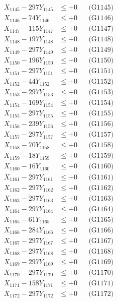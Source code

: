 \documentclass[a4paper,10pt]{article}
\begin{document}
{\begin{align}
X_{1145} - 297Y_{1145} &\leq +0 && \text{(G1145)} \\
X_{1146} - 74Y_{1146} &\leq +0 && \text{(G1146)} \\
X_{1147} - 115Y_{1147} &\leq +0 && \text{(G1147)} \\
X_{1148} - 197Y_{1148} &\leq +0 && \text{(G1148)} \\
X_{1149} - 297Y_{1149} &\leq +0 && \text{(G1149)} \\
X_{1150} - 196Y_{1150} &\leq +0 && \text{(G1150)} \\
\allowbreak
X_{1151} - 297Y_{1151} &\leq +0 && \text{(G1151)} \\
X_{1152} - 44Y_{1152} &\leq +0 && \text{(G1152)} \\
X_{1153} - 297Y_{1153} &\leq +0 && \text{(G1153)} \\
X_{1154} - 169Y_{1154} &\leq +0 && \text{(G1154)} \\
X_{1155} - 297Y_{1155} &\leq +0 && \text{(G1155)} \\
X_{1156} - 239Y_{1156} &\leq +0 && \text{(G1156)} \\
X_{1157} - 297Y_{1157} &\leq +0 && \text{(G1157)} \\
X_{1158} - 70Y_{1158} &\leq +0 && \text{(G1158)} \\
X_{1159} - 18Y_{1159} &\leq +0 && \text{(G1159)} \\
X_{1160} - 16Y_{1160} &\leq +0 && \text{(G1160)} \\
\allowbreak
X_{1161} - 297Y_{1161} &\leq +0 && \text{(G1161)} \\
X_{1162} - 297Y_{1162} &\leq +0 && \text{(G1162)} \\
X_{1163} - 297Y_{1163} &\leq +0 && \text{(G1163)} \\
X_{1164} - 297Y_{1164} &\leq +0 && \text{(G1164)} \\
X_{1165} - 61Y_{1165} &\leq +0 && \text{(G1165)} \\
X_{1166} - 284Y_{1166} &\leq +0 && \text{(G1166)} \\
X_{1167} - 297Y_{1167} &\leq +0 && \text{(G1167)} \\
X_{1168} - 297Y_{1168} &\leq +0 && \text{(G1168)} \\
X_{1169} - 297Y_{1169} &\leq +0 && \text{(G1169)} \\
X_{1170} - 297Y_{1170} &\leq +0 && \text{(G1170)} \\
\allowbreak
X_{1171} - 158Y_{1171} &\leq +0 && \text{(G1171)} \\
X_{1172} - 297Y_{1172} &\leq +0 && \text{(G1172)} \\

\end{align}}
\end{document}
